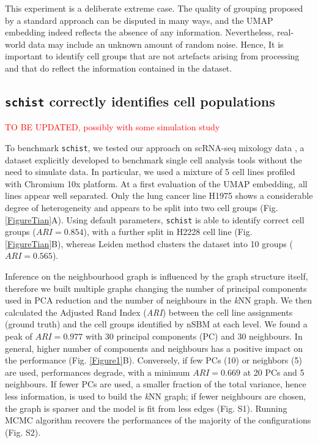 \documentclass[10pt]{article}
\begin{document}
This experiment is a deliberate extreme case. The quality of grouping proposed by a standard approach can be disputed in many ways, and the UMAP embedding indeed reflects the absence of any information. Nevertheless, real-world data may include an unknown amount of random noise. Hence, It is important to identify cell groups that are not artefacts arising from processing and that do reflect the information contained in the dataset. 

\subsection*{\texttt{schist} correctly identifies cell populations}

\textcolor{red}{TO BE UPDATED, possibly with some simulation study}


To benchmark \texttt{schist}, we tested our approach on scRNA-seq mixology data \cite{tian_2019}, a dataset explicitly developed to benchmark single cell analysis tools without the need to simulate data. In particular, we used a mixture of 5 cell lines profiled with Chromium 10x platform. At a first evaluation of the UMAP embedding, all lines appear well separated. Only the lung cancer line H1975 shows a considerable degree of heterogeneity and appears to be split into two cell groups (Fig. \ref{FigureTian}A). Using default parameters, \texttt{schist} is able to identify correct cell groups ($ARI=0.854$), with a further split in H2228 cell line (Fig. \ref{FigureTian}B), whereas Leiden method clusters the dataset into 10 groups ($ARI=0.565$).


 Inference on the neighbourhood graph is influenced by the graph structure itself, therefore we built multiple graphs changing the number of principal components used in PCA reduction and the number of neighbours in the \emph{k}NN graph. We then calculated the Adjusted Rand Index (\emph{ARI}) between the cell line assignments (ground truth) and the cell groups identified by nSBM at each level. We found a peak of $ARI=0.977$ with 30 principal components (PC) and 30 neighbours. In general, higher number of components and neighbours has a positive impact on the performance (Fig. \ref{Figure1}B). Conversely, if few PCs (10) or neighbors (5) are used, performances degrade, with a minimum $ARI=0.669$ at 20 PCs and 5 neighbours. If fewer PCs are used, a smaller fraction of the total variance, hence less information, is used to build the \emph{k}NN graph; if fewer neighbours are chosen, the graph is sparser and the model is fit from less edges (Fig. S1). Running MCMC algorithm recovers the performances of the majority of the configurations (Fig. S2).
\end{document}
